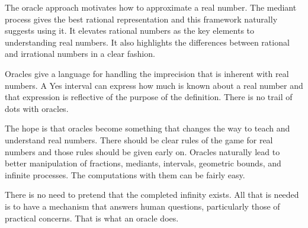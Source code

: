 \documentclass[12pt]{article}
\begin{document}
The oracle approach motivates how to approximate a real number. The mediant process gives the best rational representation and this framework naturally suggests using it. It elevates rational numbers as the key elements to understanding real numbers. It also highlights the differences between rational and irrational numbers in a clear fashion. 

Oracles give a language for handling the imprecision that is inherent with real numbers. A Yes interval can express how much is known about a real number and that expression is reflective of the purpose of the definition. There is no  trail of dots with oracles. 

The hope is that oracles become something that changes the way to teach and understand real numbers. There should be clear rules of the game for real numbers and those rules should be given early on. Oracles naturally lead to better manipulation of fractions, mediants, intervals, geometric bounds, and infinite processes. The computations with them can be fairly easy. 

There is no need to pretend that the completed infinity exists. All that is needed is to have a mechanism that answers human questions, particularly those of practical concerns. That is what an oracle does. 

\medskip

\normalem %
\printbibliography
\end{document}
